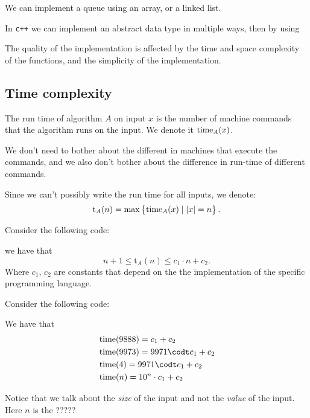 \documentclass[11pt,a4paper]{article}
\begin{document}
We can implement a queue using an array, or a linked list.

In \texttt{c++} we can implement an abstract data type in multiple ways, then
by using

The quality of the implementation is affected by the time and space complexity
of the functions, and the simplicity of the implementation.

\subsection{Time complexity}

\begin{definition}
    The run time of algorithm $A$ on input $x$ is the number of machine
    commands that the algorithm runs on the input.
    We denote it $\operatorname{time}_A(x)$.
\end{definition}
\begin{remark}
    We don't need to bother about the different in machines that execute
    the commands, and we also don't bother about the difference in run-time
    of different commands.
\end{remark}

Since we can't possibly write the run time for all inputs, we denote:
\[
    \mathrm t_A(n) = \max\set{\operatorname{time}_A(x) \mid |x| = n}.
\]

\begin{example}
    Consider the following code:

    we have that
    \[
        n + 1 \le \mathrm t_A(n) \le c_1 \cdot n + c_2.
    \]
    Where $c_1$, $c_2$ are constants that depend on the the implementation
    of the specific programming language.
\end{example}

\begin{example}
    Consider the following code:

    We have that
    \begin{align*}
        &\timeop(9888) = c_1 + c_2 \\
        &\timeop(9973) = 9971 \codt c_1 + c_2 \\
        &\timeop(4) = 9971 \codt c_1 + c_2 \\
        &\timeop(n) = 10^n \cdot c_1 + c_2
    \end{align*}
\end{example}
\begin{remark}
    Notice that we talk about the \emph{size} of the input and not the 
    \emph{value} of the input.
    Here $n$ is the ?????
\end{remark}
\end{document}
